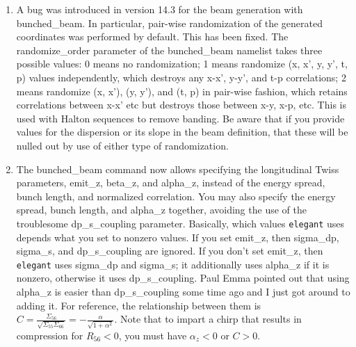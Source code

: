 \begin{enumerate}
\item A bug was introduced in version 14.3 for the beam generation
with bunched\_beam.  In particular, pair-wise randomization of the
generated coordinates was performed by default.  This has been fixed.
The randomize\_order parameter of the bunched\_beam namelist takes
three possible values: 0 means no randomization; 1 means randomize (x,
x', y, y', t, p) values independently, which destroys any x-x', y-y',
and t-p correlations; 2 means randomize (x, x'), (y, y'), and (t, p)
in pair-wise fashion, which retains correlations between x-x' etc but
destroys those between x-y, x-p, etc.  This is used with Halton
sequences to remove banding.  Be aware that if you provide values for
the dispersion or its slope in the beam definition, that these will be
nulled out by use of either type of randomization.

\item The bunched\_beam command now allows specifying the longitudinal
Twiss parameters, emit\_z, beta\_z, and alpha\_z, instead of the
energy spread, bunch length, and normalized correlation.  You may also
specify the energy spread, bunch length, and alpha\_z together,
avoiding the use of the troublesome dp\_s\_coupling parameter.
Basically, which values {\tt elegant} uses depends what you set to
nonzero values.  If you set emit\_z, then sigma\_dp, sigma\_s, and
dp\_s\_coupling are ignored.  If you don't set emit\_z, then {\tt
elegant} uses sigma\_dp and sigma\_s; it additionally uses alpha\_z if
it is nonzero, otherwise it uses dp\_s\_coupling.  Paul Emma pointed out
that using alpha\_z is easier than dp\_s\_coupling some time ago and I
just got around to adding it.  For reference, the relationship between
them is $ C = \frac{\Sigma_{56}}{\sqrt{\Sigma_{55}\Sigma_{66}}} =
-\frac{\alpha}{\sqrt{1+\alpha^2}}$.  Note that to impart a
chirp that results in compression for $R_{56}<0$, you must have
$\alpha_z<0$ or $C>0$.


\end{enumerate}
